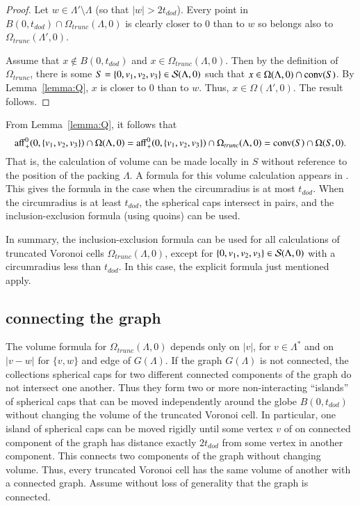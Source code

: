 \documentclass{article} %
\begin{document}
\begin{proof} Let $w\in \Lambda'\setminus\Lambda$ (so that  $|w|>2t_{dod}$).
Every point in $B(0,t_{dod})\cap \Omega_{trunc}(\Lambda,0)$ 
is clearly closer to $0$ than to $w$ so
belongs also to $\Omega_{trunc}(\Lambda',0)$.

Assume that $x\not\in B(0,t_{dod})$ and $x\in \Omega_{trunc}(\Lambda,0)$.
Then by the definition of $\Omega_{trunc}$,
there is some $S=\{0,v_1,v_2,v_3\}\in {\mathcal S}(\Lambda,0)$ such that
$x\in \Omega(\Lambda,0)\cap {\operatorname{conv}}(S)$.  By Lemma~\ref{lemma:Q},
$x$ is closer to $0$ than to $w$.  Thus, $x\in\Omega(\Lambda',0)$.
The result follows.
\end{proof}

From Lemma~\ref{lemma:Q}, it follows that
\begin{equation}\label{eqn:omega-3}
{\operatorname{aff}}^0_+(0,\{v_1,v_2,v_3\}) \cap \Omega(\Lambda,0) = 
{\operatorname{aff}}^0_+(0,\{v_1,v_2,v_3\}) \cap \Omega_{trunc}(\Lambda,0) = 
{\operatorname{conv}}(S)\cap\Omega(S,0).
\end{equation}
That is, the calculation of volume can be made locally in $S$ without
reference to the position of the packing $\Lambda$.
A formula for this volume calculation appears in 
\cite[\S8.6.3]{Part1}.  This gives the formula in the case
when the circumradius is at most $t_{dod}$.  When the circumradius
is at least $t_{dod}$, the spherical caps intersect in pairs,
and the inclusion-exclusion formula (using quoins)
can be used.

In summary, the inclusion-exclusion formula can be used for all
calculations of truncated Voronoi cells $\Omega_{trunc}(\Lambda,0)$,
except for $\{0,v_1,v_2,v_3\}\in {\mathcal S}(\Lambda,0)$ with
a circumradius less than $t_{dod}$.  In this case, 
the explicit formula just mentioned apply.

\subsection{connecting the graph}

The volume formula for $\Omega_{trunc}(\Lambda,0)$
depends only on $|v|$, for $v\in\Lambda^*$ and on
$|v-w|$ for $\{v,w\}$ and edge of $G(\Lambda)$.
If the graph $G(\Lambda)$ is not connected, the
collections spherical caps for two different connected components
of the graph do not intersect one another.  Thus they form
two or more non-interacting ``islands'' of spherical caps that
can be moved independently around the globe $B(0,t_{dod})$
without changing the volume of
the truncated Voronoi cell.  In particular, one island of spherical
caps can be moved rigidly until some vertex $v$ of on connected
component of the graph has distance exactly $2t_{dod}$ from some
vertex in another component.  This connects two components of the
graph without changing volume.  Thus, every truncated Voronoi cell
has the same volume of another with a connected graph.  
Assume without loss of generality that the graph is connected.
\end{document}
